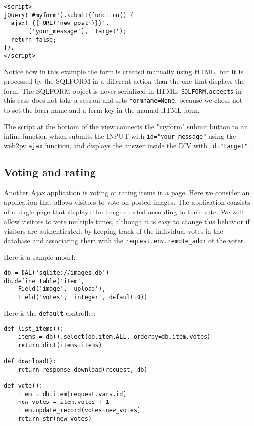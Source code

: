 \documentclass[justified,sixbynine,notoc]{tufte-book}
\def\ft{\small\tt}
\begin{document}
\begin{fullwidth}
\begin{lstlisting}[keywords={}]
<script>
jQuery('#myform').submit(function() {
  ajax('{{=URL('new_post')}}',
       ['your_message'], 'target');
  return false;
});
</script>
\end{lstlisting}

Notice how in this example the form is created manually using HTML, but it is processed by the SQLFORM in a different action than the one that displays the form. The SQLFORM object is never serialized in HTML. {\ft SQLFORM.accepts} in this case does not take a session and sets {\ft formname=None}, because we chose not to set the form name and a form key in the manual HTML form.

The script at the bottom of the view connects the "myform" submit button to an inline function which submits the INPUT with {\ft id="your\_message"} using the web2py {\ft ajax} function, and displays the answer inside the DIV with {\ft id="target"}.

\goodbreak\subsection{Voting and rating}

Another Ajax application is voting or rating items in a page. Here we consider an application that allows visitors to vote on posted images. The application consists of a single page that displays the images sorted according to their vote. We will allow visitors to vote multiple times, although it is easy to change this behavior if visitors are authenticated, by keeping track of the individual votes in the database and associating them with the {\ft request.env.remote\_addr} of the voter.

Here is a sample model:
\begin{lstlisting}
db = DAL('sqlite://images.db')
db.define_table('item',
    Field('image', 'upload'),
    Field('votes', 'integer', default=0))
\end{lstlisting}

Here is the {\ft default} controller:
\begin{lstlisting}
def list_items():
    items = db().select(db.item.ALL, orderby=db.item.votes)
    return dict(items=items)

def download():
    return response.download(request, db)

def vote():
    item = db.item[request.vars.id]
    new_votes = item.votes + 1
    item.update_record(votes=new_votes)
    return str(new_votes)
\end{lstlisting}


\end{fullwidth}
\end{document}
